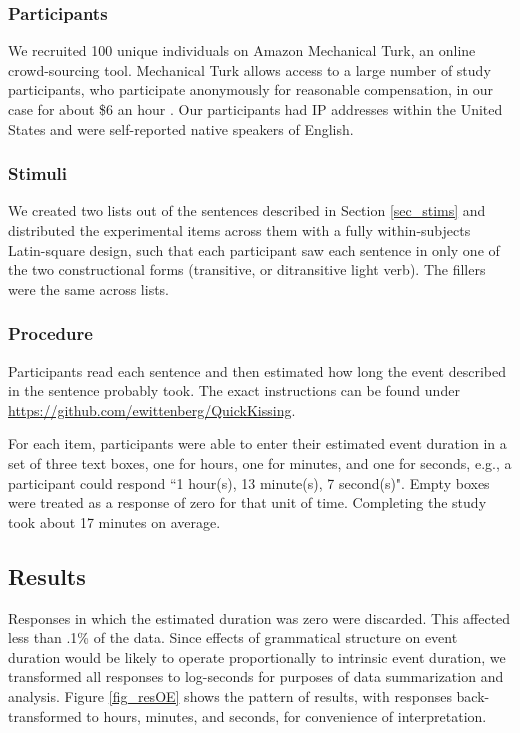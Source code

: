 \documentclass[preprint,12pt,authoryear]{elsarticle}
\begin{document}
\subsubsection{Participants} \label{sec_partOE}
We recruited 100 unique individuals on Amazon Mechanical Turk, an online
crowd-sourcing tool. Mechanical Turk allows access to a large number of study participants, who participate anonymously for reasonable compensation, in our case for about \$6 an hour \citep{buhrmester2011amazon,crump2013evaluating}. Our participants had IP addresses within the United States and were self-reported native speakers of English.

\subsubsection{Stimuli}\label{sec_stimOE}
We created two lists out of the sentences described in Section \ref{sec_stims} and distributed the experimental items across them with a fully within-subjects Latin-square design, such that each participant saw each sentence in only one of the two constructional forms (transitive, or ditransitive light verb). The fillers were the same across lists.

\subsubsection{Procedure}\label{sec_procOE}
Participants read each sentence and then estimated how long the event described in the sentence probably took. The exact instructions can be found under \url{https://github.com/ewittenberg/QuickKissing}.

For each item, participants were able to enter their estimated event duration in a set of three text boxes, one for hours, one for minutes, and one for seconds, e.g., a participant could respond ``1 hour(s), 13 minute(s), 7 second(s)". Empty boxes were treated as a response of zero for that unit of time. Completing the study took about 17 minutes on average.

\subsection{Results}\label{sec_resOE}
Responses in which the estimated duration was zero were discarded. This affected less than .1\% of the data. Since effects of grammatical structure on event duration would be likely to operate proportionally to intrinsic event duration, we transformed all responses to log-seconds for purposes of data summarization and analysis. Figure \ref{fig_resOE} shows the pattern of results, with responses back-transformed to hours, minutes, and seconds, for convenience of interpretation. 
\end{document}
